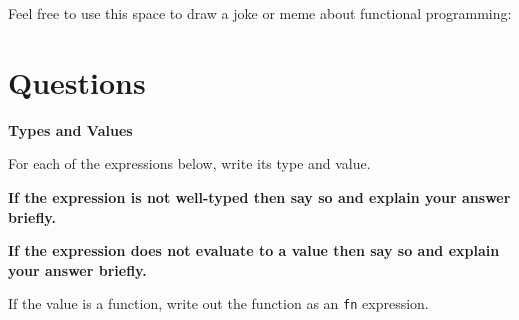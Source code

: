 \documentclass[addpoints,12pt]{exam}
\begin{document}
\begin{center}
  Feel free to use this space to draw a joke or meme about functional programming: \\

  \vspace{10pt}

  \fbox{\rule{6in}{0pt}\rule[-0.5ex]{0pt}{2.5in}}
\end{center}


\newpage


\section*{Questions}

\begin{questions}

\textbf{Types and Values}

For each of the expressions below, write its type and value.

\textbf{If the expression is not well-typed then say so and explain your answer briefly.}

\textbf{If the expression does not evaluate to a value then say so and explain your answer briefly.}

If the value is a function, write out the function as an \texttt{fn} expression.

\end{questions}
\end{document}
